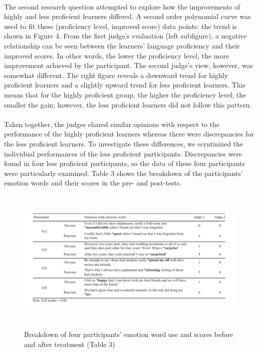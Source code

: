 \documentclass[a4paper,12pt,oneside]{article}
\let\counterwithin\relax
\begin{document}
\paragraph{}
The second research question attempted to explore how the improvements of highly and less proficient learners differed. A second order polynomial curve was used to fit these (proficiency level, improved score) data points: the trend is shown in Figure 4. From the first judge’s evaluation (left subfigure), a negative relationship can be seen between the learners’ language proficiency and their improved scores. In other words, the lower the proficiency level, the more improvement achieved by the participant. The second judge’s view, however, was somewhat different. The right figure reveals a downward trend for highly proficient learners and a slightly upward trend for less proficient learners. This means that for the highly proficient group, the higher the proficiency level, the smaller the gain; however, the less proficient learners did not follow this pattern. 
\paragraph{}
Taken together, the judges shared similar opinions with respect to the performance of the highly proficient learners whereas there were discrepancies for the less proficient learners. To investigate these differences, we scrutinized the individual performances of the less proficient participants. Discrepancies were found in four less proficient participants, so the data of these four participants were particularly examined. Table 3 shows the breakdown of the participants’ emotion words and their scores in the pre- and post-tests. 

\begin{figure}[H]
\includegraphics[height=7cm,width=16cm]{Table3.png}
\centering
\caption{Breakdown of four participants’ emotion word use and scores before and after treatment (Table 3)}
\end{figure}
\end{document}
